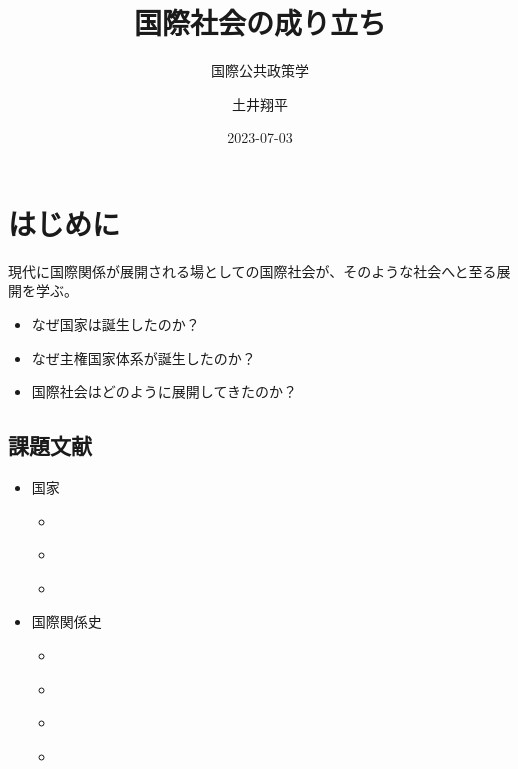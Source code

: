 \documentclass[
  xelatex,
  ja=standard]{bxjsarticle}
\title{国際社会の成り立ち}
\subtitle{国際公共政策学}
\author{土井翔平}
\date{2023-07-03}
\providecommand{\tightlist}{%
  \setlength{\itemsep}{0pt}\setlength{\parskip}{0pt}}\usepackage{longtable,booktabs,array}
\begin{document}
\maketitle
\ifdefined\Shaded\renewenvironment{Shaded}{\begin{tcolorbox}[interior hidden, borderline west={3pt}{0pt}{shadecolor}, enhanced, breakable, sharp corners, frame hidden, boxrule=0pt]}{\end{tcolorbox}}\fi

\hypertarget{ux306fux3058ux3081ux306b}{%
\section*{はじめに}\label{ux306fux3058ux3081ux306b}}

現代に国際関係が展開される場としての国際社会が、そのような社会へと至る展開を学ぶ。

\begin{itemize}
\tightlist
\item
  なぜ国家は誕生したのか？
\item
  なぜ主権国家体系が誕生したのか？
\item
  国際社会はどのように展開してきたのか？
\end{itemize}

\hypertarget{ux8ab2ux984cux6587ux732e}{%
\subsection*{課題文献}\label{ux8ab2ux984cux6587ux732e}}

\begin{itemize}
\tightlist
\item
  国家

  \begin{itemize}
  \tightlist
  \item
    \citet[第2章]{sunahara2020}
  \item
    \citet[第2章]{kubo2016}
  \item
    \citet[第1章]{kasuya2014}
  \end{itemize}
\item
  国際関係史

  \begin{itemize}
  \tightlist
  \item
    \citet[第1章 (unit 1-5)]{murata2023}
  \item
    \citet[第2章]{nakanishi2013}
  \item
    \citet{ogawa2018}
  \item
    \citet[第1-4章]{yamakage2012}
  \end{itemize}
\end{itemize}
\end{document}
